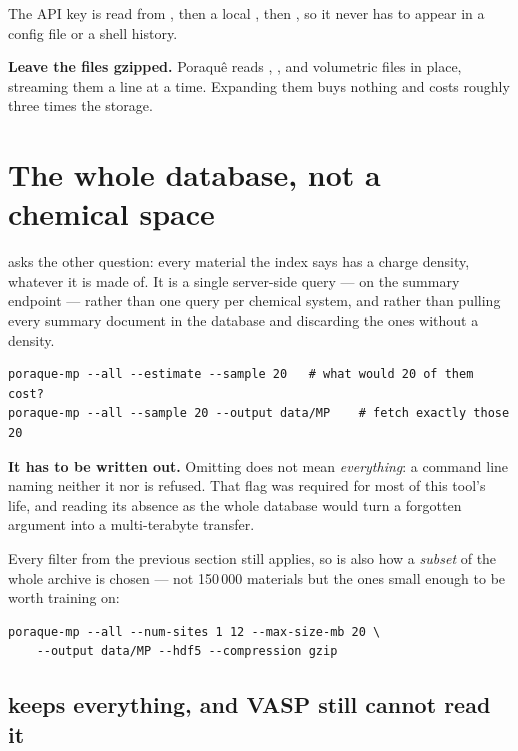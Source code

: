 The API key is read from , then a local , then
, so it never has to appear in a config file or a
shell history.

\begin{ptip}
\textbf{Leave the files gzipped.} Poraqu\^e reads , ,
 and  volumetric files in place, streaming them a line at
a time. Expanding them buys nothing and costs roughly three times the storage.
\end{ptip}

\section{The whole database, not a chemical space}
\label{sec:mp-all}

 asks the other question: every material the index says has a charge
density, whatever it is made of. It is a single server-side query ---
 on the summary endpoint --- rather than one
query per chemical system, and rather than pulling every summary document in
the database and discarding the ones without a density.

\begin{lstlisting}
poraque-mp --all --estimate --sample 20   # what would 20 of them cost?
poraque-mp --all --sample 20 --output data/MP    # fetch exactly those 20
\end{lstlisting}

\begin{pwarn}
\textbf{It has to be written out.} Omitting  does not mean
\emph{everything}: a command line naming neither it nor  is refused.
That flag was required for most of this tool's life, and reading its absence as
the whole database would turn a forgotten argument into a multi-terabyte
transfer.
\end{pwarn}

Every filter from the previous section still applies, so  is also
how a \emph{subset} of the whole archive is chosen --- not 150\,000 materials
but the ones small enough to be worth training on:

\begin{lstlisting}
poraque-mp --all --num-sites 1 12 --max-size-mb 20 \
    --output data/MP --hdf5 --compression gzip
\end{lstlisting}

\subsection*{ keeps everything, and VASP still cannot read it}

